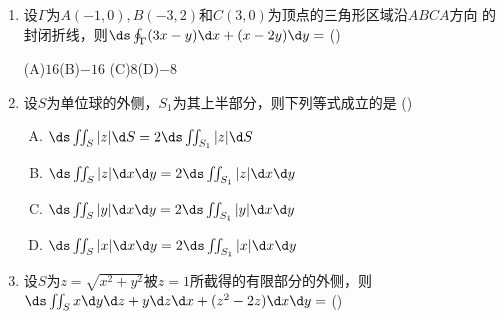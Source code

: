 \begin{enumerate}
  (A)$0$\hspace{1cm}(B)$\df23f'(0)$\hspace{1cm}
  (C)$+\infty$\hspace{1cm}(D)不存在但也不是$\infty$
  \item 设$\Gamma$为$A(-1,0),B(-3,2)$和$C(3,0)$为顶点的三角形区域沿$ABCA$方向
  的封闭折线，则$\ds\oint_{\Gamma}(3x-y)\d x+(x-2y)\d y=$
  (\underline{\hspace{1cm}})
  
  (A)$16$\hspace{1cm}(B)$-16$\hspace{1cm}
  (C)$8$\hspace{1cm}(D)$-8$
  \item 设$S$为单位球的外侧，$S_1$为其上半部分，则下列等式成立的是
  (\underline{\hspace{1cm}})
  \begin{enumerate}[(A)]
    \item $\ds\iint_{S}|z|\d S=2\ds\iint_{S_1}|z|\d S$
    \item $\ds\iint_{S}|z|\d x\d y=2\ds\iint_{S_1}|z|\d x\d y$
    \item $\ds\iint_{S}|y|\d x\d y=2\ds\iint_{S_1}|y|\d x\d y$
    \item $\ds\iint_{S}|x|\d x\d y=2\ds\iint_{S_1}|x|\d x\d y$
  \end{enumerate}
  \item 设$S$为$z=\sqrt{x^2+y^2}$被$z=1$所截得的有限部分的外侧，则
  $\ds\iint_S x\d y\d z+y\d z\d x+(z^2-2z)\d x\d y=$
  (\underline{\hspace{1cm}})
  

\end{enumerate}
